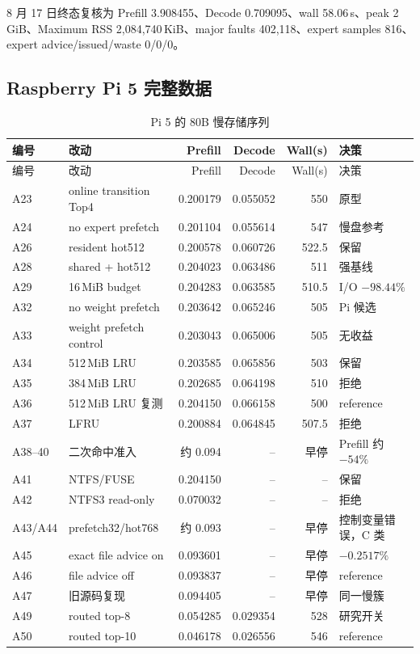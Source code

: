 8 月 17 日终态复核为 Prefill 3.908455、Decode 0.709095、wall 58.06\,s、peak 2\,GiB、Maximum RSS 2,084,740\,KiB、major faults 402,118、expert samples 816、expert advice/issued/waste 0/0/0。

\subsection{Raspberry Pi 5 完整数据}

\begin{longtable}{p{}p{}rrrp{}}
  \caption{Pi 5 的 80B 慢存储序列}\label{tab:appendix-pi-all}\\
  \toprule 编号 & 改动 & Prefill & Decode & Wall(s) & 决策 \\
  \midrule
  \endfirsthead
  \toprule 编号 & 改动 & Prefill & Decode & Wall(s) & 决策 \\
  \midrule
  \endhead
  A23 & online transition Top4 & 0.200179 & 0.055052 & 550 & 原型 \\
  A24 & no expert prefetch & 0.201104 & 0.055614 & 547 & 慢盘参考 \\
  A26 & resident hot512 & 0.200578 & 0.060726 & 522.5 & 保留 \\
  A28 & shared + hot512 & 0.204023 & 0.063486 & 511 & 强基线 \\
  A29 & 16\,MiB budget & 0.204283 & 0.063585 & 510.5 & I/O $-98.44\%$ \\
  A32 & no weight prefetch & 0.203642 & 0.065246 & 505 & Pi 候选 \\
  A33 & weight prefetch control & 0.203043 & 0.065006 & 505 & 无收益 \\
  A34 & 512\,MiB LRU & 0.203585 & 0.065856 & 503 & 保留 \\
  A35 & 384\,MiB LRU & 0.202685 & 0.064198 & 510 & 拒绝 \\
  A36 & 512\,MiB LRU 复测 & 0.204150 & 0.066158 & 500 & reference \\
  A37 & LFRU & 0.200884 & 0.064845 & 507.5 & 拒绝 \\
  A38--40 & 二次命中准入 & 约 0.094 & -- & 早停 & Prefill 约 $-54\%$ \\
  A41 & NTFS/FUSE & 0.204150 & -- & -- & 保留 \\
  A42 & NTFS3 read-only & 0.070032 & -- & -- & 拒绝 \\
  A43/A44 & prefetch32/hot768 & 约 0.093 & -- & 早停 & 控制变量错误，C 类 \\
  A45 & exact file advice on & 0.093601 & -- & 早停 & $-0.2517\%$ \\
  A46 & file advice off & 0.093837 & -- & 早停 & reference \\
  A47 & 旧源码复现 & 0.094405 & -- & 早停 & 同一慢簇 \\
  A49 & routed top-8 & 0.054285 & 0.029354 & 528 & 研究开关 \\
  A50 & routed top-10 & 0.046178 & 0.026556 & 546 & reference \\
  \bottomrule
\end{longtable}

